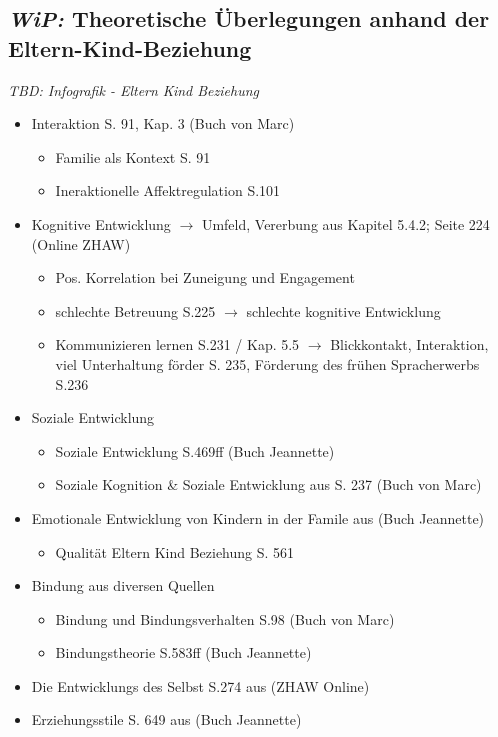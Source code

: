 \subsection{\textit{WiP:} Theoretische Überlegungen anhand der Eltern-Kind-Beziehung} \label{sec:TheretischeÜberlegungen}
\textit{TBD: Infografik - Eltern Kind Beziehung}
\begin{itemize}
    \item Interaktion  S. 91, Kap. 3 (Buch von Marc)
    \begin{itemize}
        \item Familie als Kontext S. 91
        \item Ineraktionelle Affektregulation S.101
    \end{itemize}
    \item Kognitive Entwicklung $\rightarrow$ Umfeld, Vererbung aus  Kapitel 5.4.2; Seite 224 (Online ZHAW)
    \begin{itemize}
        \item Pos. Korrelation bei Zuneigung und Engagement
        \item schlechte Betreuung S.225 $\rightarrow$ schlechte kognitive Entwicklung
        \item Kommunizieren lernen S.231 / Kap. 5.5 $\rightarrow$ Blickkontakt, Interaktion, viel Unterhaltung förder S. 235, Förderung des frühen Spracherwerbs S.236
    \end{itemize}
    \item Soziale Entwicklung
    \begin{itemize}
        \item Soziale Entwicklung S.469ff  (Buch Jeannette)
        \item Soziale Kognition \& Soziale Entwicklung aus  S. 237 (Buch von Marc)
    \end{itemize}
    \item Emotionale Entwicklung von Kindern in der Famile aus  (Buch Jeannette)
    \begin{itemize}
        \item Qualität Eltern Kind Beziehung S. 561
    \end{itemize}
    \item Bindung aus diversen Quellen
    \begin{itemize}
        \item Bindung und Bindungsverhalten S.98  (Buch von Marc)
        \item Bindungstheorie S.583ff  (Buch Jeannette)
    \end{itemize}
    \item Die Entwicklungs des Selbst S.274 aus  (ZHAW Online) 
    \item Erziehungsstile S. 649 aus  (Buch Jeannette)
\end{itemize}

